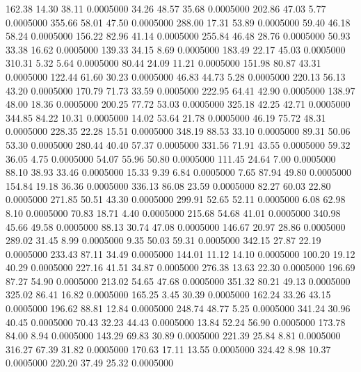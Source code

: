  162.38   14.30   38.11   0.0005000
  34.26   48.57   35.68   0.0005000
 202.86   47.03    5.77   0.0005000
 355.66   58.01   47.50   0.0005000
 288.00   17.31   53.89   0.0005000
  59.40   46.18   58.24   0.0005000
 156.22   82.96   41.14   0.0005000
 255.84   46.48   28.76   0.0005000
  50.93   33.38   16.62   0.0005000
 139.33   34.15    8.69   0.0005000
 183.49   22.17   45.03   0.0005000
 310.31    5.32    5.64   0.0005000
  80.44   24.09   11.21   0.0005000
 151.98   80.87   43.31   0.0005000
 122.44   61.60   30.23   0.0005000
  46.83   44.73    5.28   0.0005000
 220.13   56.13   43.20   0.0005000
 170.79   71.73   33.59   0.0005000
 222.95   64.41   42.90   0.0005000
 138.97   48.00   18.36   0.0005000
 200.25   77.72   53.03   0.0005000
 325.18   42.25   42.71   0.0005000
 344.85   84.22   10.31   0.0005000
  14.02   53.64   21.78   0.0005000
  46.19   75.72   48.31   0.0005000
 228.35   22.28   15.51   0.0005000
 348.19   88.53   33.10   0.0005000
  89.31   50.06   53.30   0.0005000
 280.44   40.40   57.37   0.0005000
 331.56   71.91   43.55   0.0005000
  59.32   36.05    4.75   0.0005000
  54.07   55.96   50.80   0.0005000
 111.45   24.64    7.00   0.0005000
  88.10   38.93   33.46   0.0005000
  15.33    9.39    6.84   0.0005000
   7.65   87.94   49.80   0.0005000
 154.84   19.18   36.36   0.0005000
 336.13   86.08   23.59   0.0005000
  82.27   60.03   22.80   0.0005000
 271.85   50.51   43.30   0.0005000
 299.91   52.65   52.11   0.0005000
   6.08   62.98    8.10   0.0005000
  70.83   18.71    4.40   0.0005000
 215.68   54.68   41.01   0.0005000
 340.98   45.66   49.58   0.0005000
  88.13   30.74   47.08   0.0005000
 146.67   20.97   28.86   0.0005000
 289.02   31.45    8.99   0.0005000
   9.35   50.03   59.31   0.0005000
 342.15   27.87   22.19   0.0005000
 233.43   87.11   34.49   0.0005000
 144.01   11.12   14.10   0.0005000
 100.20   19.12   40.29   0.0005000
 227.16   41.51   34.87   0.0005000
 276.38   13.63   22.30   0.0005000
 196.69   87.27   54.90   0.0005000
 213.02   54.65   47.68   0.0005000
 351.32   80.21   49.13   0.0005000
 325.02   86.41   16.82   0.0005000
 165.25    3.45   30.39   0.0005000
 162.24   33.26   43.15   0.0005000
 196.62   88.81   12.84   0.0005000
 248.74   48.77    5.25   0.0005000
 341.24   30.96   40.45   0.0005000
  70.43   32.23   44.43   0.0005000
  13.84   52.24   56.90   0.0005000
 173.78   84.00    8.94   0.0005000
 143.29   69.83   30.89   0.0005000
 221.39   25.84    8.81   0.0005000
 316.27   67.39   31.82   0.0005000
 170.63   17.11   13.55   0.0005000
 324.42    8.98   10.37   0.0005000
 220.20   37.49   25.32   0.0005000
